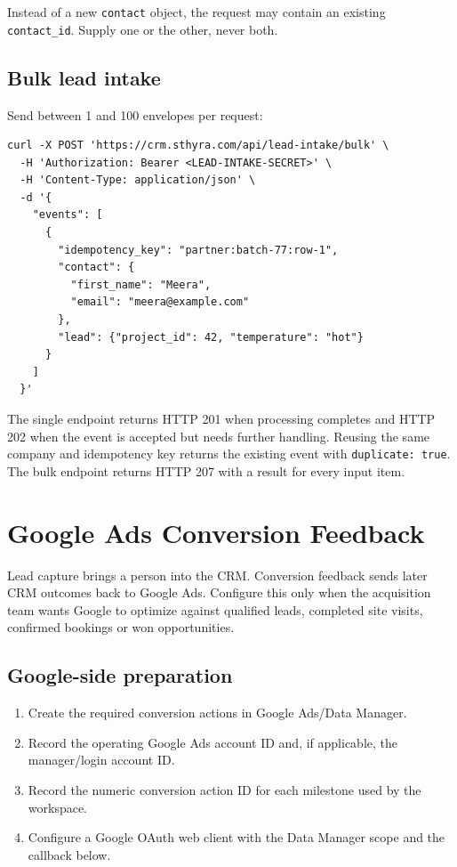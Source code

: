 \documentclass[11pt,a4paper]{article}
\newcommand{\code}[1]{\texttt{#1}}
\begin{document}
Instead of a new \code{contact} object, the request may contain an existing \code{contact\_id}. Supply one or the other, never both.

\subsection{Bulk lead intake}

Send between 1 and 100 envelopes per request:

\begin{lstlisting}
curl -X POST 'https://crm.sthyra.com/api/lead-intake/bulk' \
  -H 'Authorization: Bearer <LEAD-INTAKE-SECRET>' \
  -H 'Content-Type: application/json' \
  -d '{
    "events": [
      {
        "idempotency_key": "partner:batch-77:row-1",
        "contact": {
          "first_name": "Meera",
          "email": "meera@example.com"
        },
        "lead": {"project_id": 42, "temperature": "hot"}
      }
    ]
  }'
\end{lstlisting}

The single endpoint returns HTTP 201 when processing completes and HTTP 202 when the event is accepted but needs further handling. Reusing the same company and idempotency key returns the existing event with \code{duplicate: true}. The bulk endpoint returns HTTP 207 with a result for every input item.

\section{Google Ads Conversion Feedback}

Lead capture brings a person into the CRM. Conversion feedback sends later CRM outcomes back to Google Ads. Configure this only when the acquisition team wants Google to optimize against qualified leads, completed site visits, confirmed bookings or won opportunities.

\subsection{Google-side preparation}

\begin{enumerate}
  \item Create the required conversion actions in Google Ads/Data Manager.
  \item Record the operating Google Ads account ID and, if applicable, the manager/login account ID.
  \item Record the numeric conversion action ID for each milestone used by the workspace.
  \item Configure a Google OAuth web client with the Data Manager scope and the callback below.
\end{enumerate}
\end{document}
